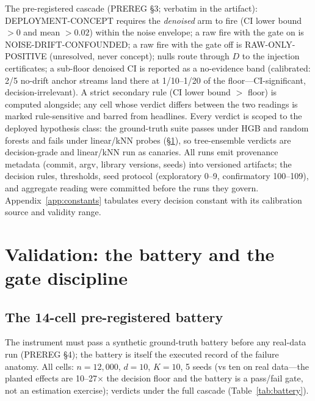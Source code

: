 \documentclass[10pt]{article} %
\begin{document}
The pre-registered cascade (PREREG \S3; verbatim in the artifact): DEPLOYMENT-CONCEPT requires
the \emph{denoised} arm to fire (CI lower bound $> 0$ and mean $> 0.02$) within the noise envelope; a raw
fire with the gate on is NOISE-DRIFT-CONFOUNDED; a raw fire with the gate off is
RAW-ONLY-POSITIVE (unresolved, never concept); nulls route through $D$ to the injection
certificates; a sub-floor denoised CI is reported as a no-evidence band (calibrated: 2/5 no-drift
anchor streams land there at 1/10--1/20 of the floor---CI-significant, decision-irrelevant). A
strict secondary rule (CI lower bound $>$ floor) is computed alongside; any cell whose verdict
differs between the two readings is marked rule-sensitive and barred from headlines. Every
verdict is scoped to the deployed hypothesis class: the ground-truth suite passes under HGB and
random forests and fails under linear/kNN probes (\S\ref{sec:validation}), so tree-ensemble verdicts are
decision-grade and linear/kNN run as canaries. All runs emit provenance metadata (commit, argv,
library versions, seeds) into versioned artifacts; the decision rules, thresholds, seed
protocol (exploratory 0--9, confirmatory 100--109), and aggregate reading were committed before
the runs they govern. Appendix~\ref{app:constants} tabulates every decision constant with its
calibration source and validity range.

\section{Validation: the battery and the gate discipline}\label{sec:validation}

\subsection{The 14-cell pre-registered battery}\label{sec:battery}

The instrument must pass a synthetic ground-truth battery before any real-data run (PREREG \S4);
the battery is itself the executed record of the failure anatomy. All cells: $n = 12{,}000$, $d = 10$,
$K = 10$, 5 seeds (vs ten on real data---the planted effects are 10--27$\times$ the decision
floor and the battery is a pass/fail gate, not an estimation exercise); verdicts under the full
cascade (Table~\ref{tab:battery}).
\end{document}
